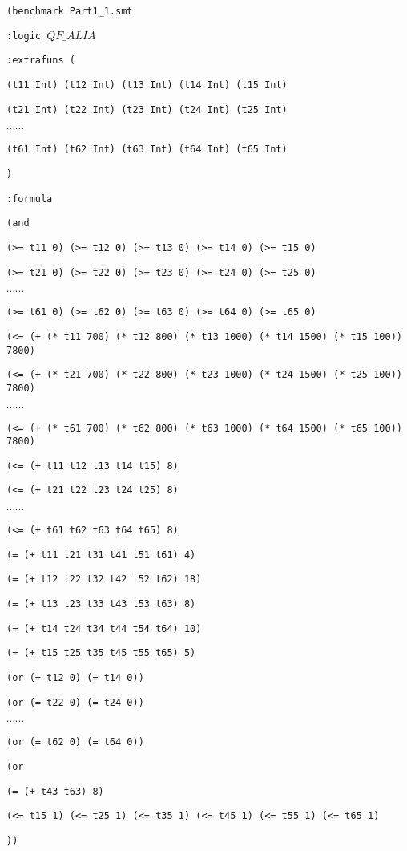 \documentclass[11pt]{article}
\begin{document}
{\footnotesize

{\tt (benchmark Part1\_1.smt}

{\tt :logic $QF\_ALIA$}

{\tt :extrafuns (}

{\tt (t11 Int) (t12 Int) (t13 Int) (t14 Int) (t15 Int) }

{\tt (t21 Int) (t22 Int) (t23 Int) (t24 Int) (t25 Int) }

$\cdots \cdots$

{\tt (t61 Int) (t62 Int) (t63 Int) (t64 Int) (t65 Int) }

{\tt )}

{\tt :formula}

{\tt   (and}

{\tt (>= t11 0) (>= t12 0) (>= t13 0) (>= t14 0) (>= t15 0)}

{\tt (>= t21 0) (>= t22 0) (>= t23 0) (>= t24 0) (>= t25 0)}

$\cdots \cdots$

{\tt (>= t61 0) (>= t62 0) (>= t63 0) (>= t64 0) (>= t65 0) }

{\tt (<= (+ (* t11 700) (* t12 800) (* t13 1000) (* t14 1500) (* t15 100)) 7800)}

{\tt (<= (+ (* t21 700) (* t22 800) (* t23 1000) (* t24 1500) (* t25 100)) 7800)}

$\cdots \cdots$

{\tt (<= (+ (* t61 700) (* t62 800) (* t63 1000) (* t64 1500) (* t65 100)) 7800) }

{\tt (<= (+ t11 t12 t13 t14 t15) 8)}

{\tt (<= (+ t21 t22 t23 t24 t25) 8)}

$\cdots \cdots$

{\tt (<= (+ t61 t62 t63 t64 t65) 8)}

{\tt (= (+ t11 t21 t31 t41 t51 t61) 4)}

{\tt (= (+ t12 t22 t32 t42 t52 t62) 18)}

{\tt (= (+ t13 t23 t33 t43 t53 t63) 8)}

{\tt (= (+ t14 t24 t34 t44 t54 t64) 10)}

{\tt (= (+ t15 t25 t35 t45 t55 t65) 5)}

{\tt (or (= t12 0) (= t14 0)) }

{\tt (or (= t22 0) (= t24 0)) }

$\cdots \cdots$

{\tt (or (= t62 0) (= t64 0)) }

{\tt (or}

{\tt (= (+ t43 t63) 8) }

{\tt (<= t15 1) (<= t25 1) (<= t35 1) (<= t45 1) (<= t55 1) (<= t65 1)}

{\tt )) }
}
\end{document}

